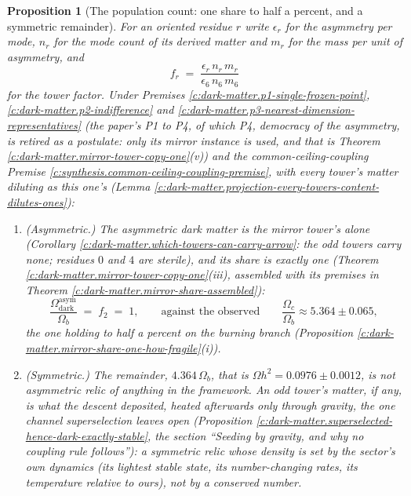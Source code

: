 \documentclass[11pt]{article}
\newtheorem{proposition}[theorem]{Proposition}
\theoremstyle{definition}
\theoremstyle{plain}
\newcommand{\changedmark}[2]{\marginpar{\raggedright\scriptsize\color{#1}#2}}
\begin{document}
\begin{proposition}[The population count: one share to half a percent, and a symmetric remainder]\label{c:dark-matter.population-count-one-share-half-percent}
\changedmark{BurntOrange}{changed since the deposit}
For an oriented residue $r$ write $\epsilon_{r}$ for the asymmetry per mode, $n_{r}$ for the mode count of its derived matter and $m_{r}$ for the mass per unit of asymmetry, and
\[
f_{r} \;=\; \frac{\epsilon_{r}\,n_{r}\,m_{r}}{\epsilon_{6}\,n_{6}\,m_{6}}
\]
for the tower factor. Under Premises \ref{c:dark-matter.p1-single-frozen-point}, \ref{c:dark-matter.p2-indifference} and \ref{c:dark-matter.p3-nearest-dimension-representatives} (the paper's P1 to P4, of which P4, democracy of the asymmetry, is retired as a postulate: only its mirror instance is used, and that is Theorem \ref{c:dark-matter.mirror-tower-copy-one}(v)) and the common-ceiling-coupling Premise \ref{c:synthesis.common-ceiling-coupling-premise}, with every tower's matter diluting as this one's (Lemma \ref{c:dark-matter.projection-every-towers-content-dilutes-ones}):
\begin{enumerate}
\item[(i)] \emph{(Asymmetric.)} The asymmetric dark matter is the mirror tower's alone (Corollary \ref{c:dark-matter.which-towers-can-carry-arrow}: the odd towers carry none; residues $0$ and $4$ are sterile), and its share is exactly one (Theorem \ref{c:dark-matter.mirror-tower-copy-one}(iii), assembled with its premises in Theorem \ref{c:dark-matter.mirror-share-assembled}):
\begin{equation}
\frac{\Omega^{\mathrm{asym}}_{\mathrm{dark}}}{\Omega_{b}} \;=\; f_{2} \;=\; 1, \qquad\text{against the observed}\qquad \frac{\Omega_{c}}{\Omega_{b}} \approx 5.364 \pm 0.065,
\end{equation}
the one holding to half a percent on the burning branch (Proposition \ref{c:dark-matter.mirror-share-one-how-fragile}(i)).
\item[(ii)] \emph{(Symmetric.)} The remainder, $4.364\,\Omega_{b}$, that is $\Omega h^{2} = 0.0976 \pm 0.0012$, is not asymmetric relic of anything in the framework. An odd tower's matter, if any, is what the descent deposited, heated afterwards only through gravity, the one channel superselection leaves open (Proposition \ref{c:dark-matter.superselected-hence-dark-exactly-stable}, the section ``Seeding by gravity, and why no coupling rule follows''): a symmetric relic whose density is set by the sector's own dynamics (its lightest stable state, its number-changing rates, its temperature relative to ours), not by a conserved number.

\end{enumerate}
\end{proposition}
\end{document}
